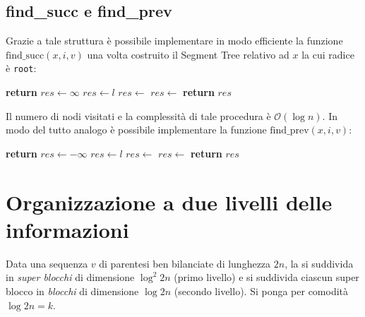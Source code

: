 \documentclass{article}
\begin{document}
\subsection{find\_succ e find\_prev}
Grazie a tale struttura è possibile implementare in modo efficiente la funzione $\text{find\_succ}(x,i,v)$ una volta costruito il Segment Tree relativo ad $x$ la cui radice è \texttt{root}:
    \begin{algorithmic}[1]
        \State \textbf{return} 
    \EndProcedure
    \State
            \State $res\gets\infty$
            \State $res\gets l$
        \Else
            \State $res\gets$
                \State $res\gets$
            \EndIf
        \EndIf
        \State \textbf{return} $res$
    \EndFunction
    \end{algorithmic}
Il numero di nodi visitati e la complessità di tale procedura è $\mathcal{O}(\log{n})$. In modo del tutto analogo è possibile implementare la funzione $\text{find\_prev}(x,i,v)$:
    \begin{algorithmic}[1]
        \State \textbf{return} 
    \EndProcedure
    \State
            \State $res\gets -\infty$
            \State $res\gets l$
        \Else
            \State $res\gets$
                \State $res\gets$
            \EndIf
        \EndIf
        \State \textbf{return} $res$
    \EndFunction
    \end{algorithmic}

\section{Organizzazione a due livelli delle informazioni}
Data una sequenza $v$ di parentesi ben bilanciate di lunghezza $2n$, la si suddivida in \textit{super blocchi} di dimensione $\log^2{2n}$ (primo livello) e si suddivida ciascun super blocco in \textit{blocchi} di dimensione $\log 2n$ (secondo livello). Si ponga per comodità $\log{2n}=k$.
\end{document}
